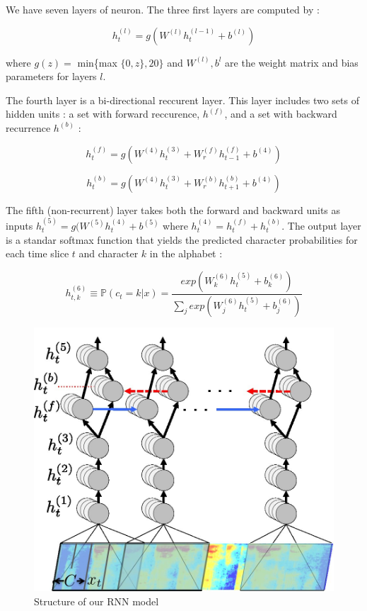 \documentclass[12pt]{article}
\begin{document}
We have seven layers of neuron. The three first layers are computed by :

\[ h_t^{(l)} = g(W^{(l)}h_t^{(l-1)} + b^{(l)}) \]

where $g(z) =$ min\{max $\{0,z\}, 20\}$ and $W^{(l)}, b^{l}$ are the weight matrix and bias parameters for layers $l$.

The fourth layer is a bi-directional reccurent layer. This layer includes two sets of hidden units : a set with forward reccurence, $h^{(f)}$, and a set with backward recurrence $h^{(b)}$ : 

\[ h_t^{(f)} = g(W^{(4)}h_t^{(3)} + W_r^{(f)}h_{t-1}^{(f)} + b^{(4)}) \]

\[ h_t^{(b)} = g(W^{(4)}h_t^{(3)} + W_r^{(b)}h_{t+1}^{(b)} + b^{(4)}) \]

The fifth (non-recurrent) layer takes both the forward and backward units as inputs $h_t^{(5)} = g(W^{(5)}h_t^{(4)} + b^{(5)} $ where $h_t^{(4)} = h_t^{(f)} + h_t^{(b)}$. The output layer is a standar softmax function that yields the predicted character probabilities for each time slice $t$ and character $k$ in the alphabet :

\[ h_{t,k}^{(6)} \equiv \mathbb{P}(c_t=k | x) = \frac{exp(W_k^{(6)}h_t^{(5)} + b_k^{(6)})}{\sum_j exp(W_j^{(6)}h_t^{(5)} + b_j^{(6)})} \]


\begin{figure}[H]
  \begin{center}
    \includegraphics[scale=0.27]{images/photo.jpg}
    \caption{Structure of our RNN model}
  \end{center}
\end{figure}
\end{document}
